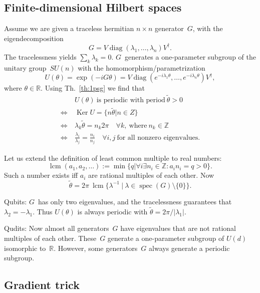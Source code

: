 \documentclass[aps,pra,10pt,twocolumn,groupedaddress,nofootinbib]{revtex4-1}
\theoremstyle{plain}
\DeclareMathOperator{\diag}{diag}  %
\DeclareMathOperator{\Ker}{Ker}    %
\DeclareMathOperator{\spec}{spec}  %
\DeclareMathOperator{\lcm}{lcm}    %
\newcommand{\be}{\begin{equation}}
\newcommand{\ee}{\end{equation}}
\newcommand{\Z}{\ensuremath{\mathbb Z}}  %
\newcommand{\R}{\ensuremath{\mathbb R}}  %
\begin{document}
\subsection{Finite-dimensional Hilbert spaces}

Assume we are given a traceless hermitian $n \times n$ generator~$G$, with the eigendecomposition
\be
G = V \diag(\lambda_1, \ldots, \lambda_n) V^\dagger.
\ee
The tracelessness yields $\sum_k \lambda_k = 0$.
$G$~generates a one-parameter subgroup of the unitary group~$SU(n)$
with the homomorphism/parametrization
\be
U(\theta) = \exp(-iG\theta)
= V \diag(e^{-i\lambda_1 \theta}, \ldots, e^{-i\lambda_n \theta}) V^\dagger,
\ee
where $\theta \in \R$. Using Th.~\ref{th:1psg} we find that
\begin{align}
  & U(\theta) \: \text{is periodic with period} \: \tilde{\theta} > 0\\
  \iff \: & \Ker U = \{n \tilde{\theta} | n \in Z\}\\
  \iff \: & \lambda_k \tilde{\theta} = n_k 2 \pi \quad \forall k, \: \text{where} \: n_k \in \Z\\
  \iff \: & \frac{\lambda_i}{\lambda_j} = \frac{n_i}{n_j} \quad \forall i,j
  \: \text{for all nonzero eigenvalues.}
\end{align}

Let us extend the definition of least common multiple to real numbers:
\be
\lcm(a_1, a_2, \ldots) := \min \{q | \forall i \exists n_i \in \Z: a_i n_i = q>0\}.
\ee
Such a number exists iff $a_i$ are rational multiples of each other.
Now
\be
\tilde{\theta} = 2\pi \: \lcm \{\lambda^{-1} \:|\: \lambda \in \spec(G) \setminus \{0\}\}.
\ee



Qubits:
$G$~has only two eigenvalues, and the tracelessness guarantees that $\lambda_2 = -\lambda_1$.
Thus $U(\theta)$ is always periodic with $\tilde{\theta} = 2\pi/|\lambda_1|$.

Qudits:
Now almost all generators~$G$ have eigenvalues that are not rational multiples of each other.
These~$G$ generate a one-parameter subgroup of $U(d)$ isomorphic to~$\R$.
However, some generators~$G$ always generate a periodic subgroup.


\subsection{Gradient trick}
\end{document}
